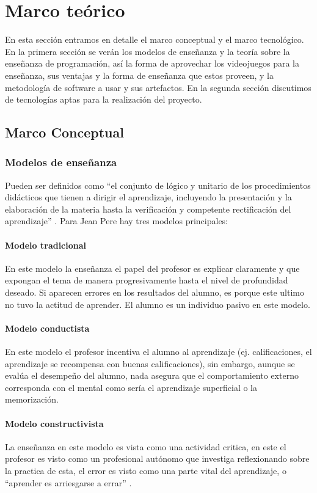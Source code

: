 \chapter{Marco teórico}
En esta sección entramos en detalle el marco conceptual y el marco tecnológico. En la primera sección se verán los modelos de enseñanza y la teoría sobre la enseñanza de programación, así la forma de aprovechar los videojuegos para la enseñanza, sus ventajas y la forma de enseñanza que estos proveen, y la metodología de software a usar y sus artefactos. En la segunda sección discutimos de tecnologías aptas para la realización del proyecto.

\section{Marco Conceptual}

\subsection{Modelos de enseñanza}
Pueden ser definidos como \enquote{el conjunto de lógico y unitario de los procedimientos didácticos que tienen a dirigir el aprendizaje, incluyendo la presentación y la elaboración de la materia hasta la verificación y competente rectificación del aprendizaje} \cite{metodos_ensenanza}. Para Jean Pere hay tres modelos principales:

\subsubsection{Modelo tradicional}
En este modelo la enseñanza el papel del profesor es explicar claramente y que expongan el tema de manera progresivamente hasta el nivel de profundidad deseado. Si aparecen errores en los resultados del alumno, es porque este ultimo no  tuvo la actitud de aprender. El alumno es un individuo pasivo en este modelo.

\subsubsection{Modelo conductista}
En este modelo el profesor incentiva el alumno al aprendizaje (ej. calificaciones, el aprendizaje se recompensa con buenas calificaciones), sin embargo, aunque se evalúa el desempeño del alumno, nada asegura que el comportamiento externo corresponda con el mental como sería el aprendizaje superficial o la memorización.

\subsubsection{Modelo constructivista}
La enseñanza en este modelo es vista como una actividad critica, en este el profesor es visto como un profesional autónomo que investiga reflexionando sobre la practica de esta, el error es visto como una parte vital del aprendizaje, o \enquote{aprender es arriesgarse a errar} \cite{metodos_ensenanza}.

